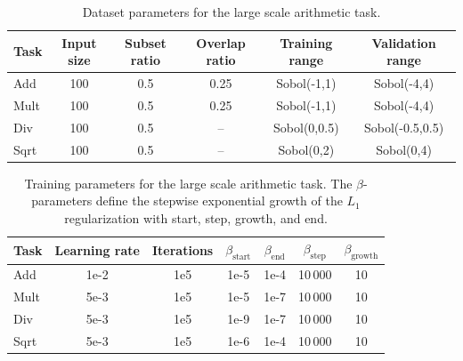 \documentclass[9pt]{article}
\begin{document}
\begin{table}[h]
  \centering
  \caption{Dataset parameters for the large scale arithmetic task.}
  \label{tab:dataset_params_large_scale}
  \begin{tabular}{lccccc}
    \toprule
    Task & Input size & Subset ratio & Overlap ratio & Training range  & Validation range\\
    \midrule
    Add  & 100        & 0.5          & 0.25          & Sobol(-1,1)     & Sobol(-4,4) \\
    Mult & 100        & 0.5          & 0.25          & Sobol(-1,1)     & Sobol(-4,4)\\
    Div  & 100        & 0.5          & --            & Sobol(0,0.5)    & Sobol(-0.5,0.5) \\
    Sqrt & 100        & 0.5          & --            & Sobol(0,2)      & Sobol(0,4) \\
    \bottomrule
  \end{tabular}
\end{table}

\begin{table}[h]
  \centering
  \caption{Training parameters for the large scale arithmetic task. The
  $\beta$-parameters define the stepwise exponential growth of the $L_1$
  regularization with start, step, growth, and end.}
  \label{tab:training_large_scale}
  \begin{tabular}{lcccccc}
    \toprule
    Task & Learning rate & Iterations & $\beta_{\text{start}}$ &
      $\beta_{\text{end}}$ & $\beta_{\text{step}}$  & $\beta_{\text{growth}}$ \\
    \midrule
    Add  & 1e-2 & 1e5 & 1e-5 & 1e-4 & 10\,000 & 10 \\
    Mult & 5e-3 & 1e5 & 1e-5 & 1e-7 & 10\,000 & 10 \\
    Div  & 5e-3 & 1e5 & 1e-9 & 1e-7 & 10\,000 & 10 \\
    Sqrt & 5e-3 & 1e5 & 1e-6 & 1e-4 & 10\,000 & 10 \\
    \bottomrule
  \end{tabular}
\end{table}
\end{document}
